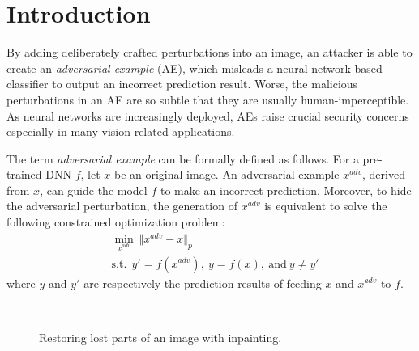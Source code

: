 \documentclass[sigconf]{acmart}
\begin{document}





\maketitle
\pagestyle{empty} 

\section{Introduction}
By adding deliberately crafted perturbations into an image,
an attacker is able to create an \emph{adversarial example} (AE), which misleads a neural-network-based classifier to output an incorrect prediction result. Worse, the malicious perturbations in an AE are so subtle that they are usually human-imperceptible. 
As neural networks are increasingly deployed, AEs raise crucial security concerns especially in many vision-related applications. 


The term \emph{adversarial example} can be formally defined as follows. For a pre-trained DNN $f$, let $x$ be an original image. An adversarial example $x^{adv}$, derived from $x$, can guide the model $f$ to make an incorrect prediction. Moreover, to hide the adversarial perturbation, the generation of $x^{adv}$ is equivalent to solve the following constrained optimization problem:
\begin{equation} \label{equation:adv}
\begin{aligned}
 &\min\limits_{x^{adv}}\ \Vert x^{adv} - x\Vert_p \\
 &\mathrm{s.t.}\ \ {y}'= f(x^{adv}),\ 
y =  f(x),\ \text{and}\ y \neq {y}'
 \end{aligned}
\end{equation}
where $y$ and ${y}'$ are respectively the prediction results of feeding $x$ and $x^{adv}$ to $f$. 

\begin{figure} \centering
{}
\ \ 
\ \ 
\caption{Restoring lost parts of an image with inpainting.}\label{fig_inpaint}
\end{figure}
\end{document}

